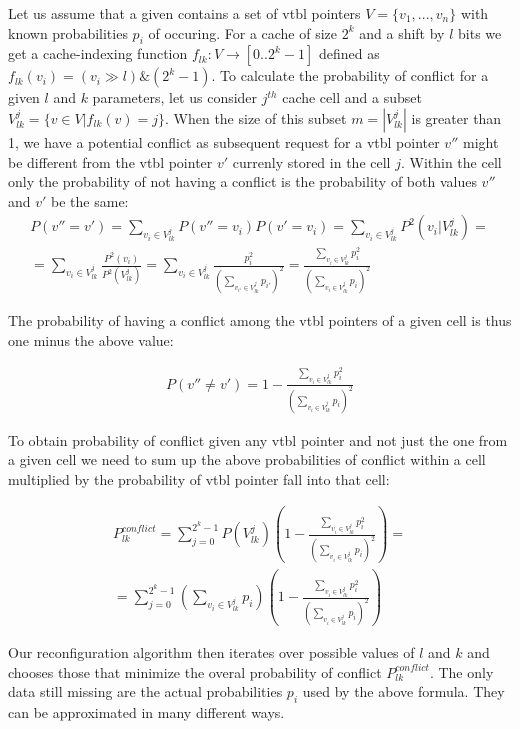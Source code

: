 Let us assume that a given  contains a set of vtbl pointers 
$V = \{v_1, ... , v_n\}$ with known probabilities $p_i$ of occuring. For a cache 
of size $2^k$ and a shift by $l$ bits we get a cache-indexing function 
$f_{lk} : V \rightarrow [0..2^k-1]$ defined as $f_{lk}(v_i) = (v_i \gg l) \& (2^k-1)$.
To calculate the probability of conflict for a given $l$ and $k$ parameters, let 
us consider $j^{th}$ cache cell and a subset $V^j_{lk}=\{v \in V | f_{lk}(v)=j\}$. 
When the size of this subset $m=|V^j_{lk}|$ is greater than 1, we have a 
potential conflict as subsequent request for a vtbl pointer $v''$ might be 
different from the vtbl pointer $v'$ currenly stored in the cell $j$. Within the 
cell only the probability of not having a conflict is the probability of both 
values $v''$ and $v'$ be the same:
\begin{eqnarray*}
P(v''=v')=\sum\limits_{v_i \in V^j_{lk}}P(v''=v_i)P(v'=v_i)=\sum\limits_{v_i \in V^j_{lk}}P^2(v_i|V^j_{lk})=\\
=\sum\limits_{v_i \in V^j_{lk}}\frac{P^2(v_i)}{P^2(V^j_{lk})}=
\sum\limits_{v_i \in V^j_{lk}}\frac{p_i^2}{(\sum\limits_{v_{i'} \in V^j_{lk}}p_{i'})^2}=
\frac{\sum\limits_{v_i \in V^j_{lk}}p_i^2}{(\sum\limits_{v_{i} \in V^j_{lk}}p_{i})^2}
\end{eqnarray*}

The probability of having a conflict among the vtbl pointers of a given cell is 
thus one minus the above value:

\begin{eqnarray*}
P(v''\neq v')=1-\frac{\sum\limits_{v_i \in V^j_{lk}}p_i^2}{(\sum\limits_{v_{i} \in V^j_{lk}}p_{i})^2}
\end{eqnarray*}

To obtain probability of conflict given any vtbl pointer and not just the one 
from a given cell we need to sum up the above probabilities of conflict within a 
cell multiplied by the probability of vtbl pointer fall into that cell:

\begin{eqnarray*}
P_{lk}^{conflict}=\sum\limits_{j=0}^{2^k-1}P(V^j_{lk})(1-\frac{\sum\limits_{v_i \in V^j_{lk}}p_i^2}{(\sum\limits_{v_{i} \in V^j_{lk}}p_{i})^2})=\\
=\sum\limits_{j=0}^{2^k-1}(\sum\limits_{v_{i} \in V^j_{lk}}p_{i})(1-\frac{\sum\limits_{v_i \in V^j_{lk}}p_i^2}{(\sum\limits_{v_{i} \in V^j_{lk}}p_{i})^2})
\end{eqnarray*}

Our reconfiguration algorithm then iterates over possible values of $l$ and $k$ 
and chooses those that minimize the overal probability of conflict $P_{lk}^{conflict}$.
The only data still missing are the actual probabilities $p_i$ used by the above 
formula. They can be approximated in many different ways.


